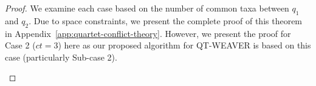 \documentclass[runningheads]{llncs}
\newcommand{\add}[1]{{\color{blue} #1}}
\begin{document}
\begin{proof}


We examine each case based on the number of common taxa between $q_1$ and $q_2$. Due to space constraints, we present the complete proof of this theorem in Appendix~\ref{app:quartet-conflict-theory}. However, we present the proof for Case 2 ($ct=3$) here as our proposed algorithm for QT-WEAVER is based on this case (particularly Sub-case 2).


\begin{itemize}






\end{itemize}
\end{proof}
\end{document}
